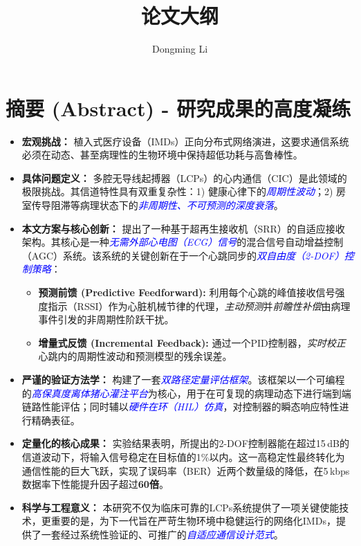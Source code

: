 \documentclass[UTF8,zihao=-4]{ctexart}
\title{\Huge\bfseries 论文大纲}
\author{Dongming Li}
\newcommand{\keyterm}[1]{\textit{\textcolor{blue}{#1}}}
\begin{document}
\maketitle
\thispagestyle{empty}
\newpage
\tableofcontents
\newpage

\section{摘要 (Abstract) - 研究成果的高度凝练}
\begin{itemize}
    \item \textbf{宏观挑战：} 植入式医疗设备（IMDs）正向分布式网络演进，这要求通信系统必须在动态、甚至病理性的生物环境中保持超低功耗与高鲁棒性。
    \item \textbf{具体问题定义：} 多腔无导线起搏器（LCPs）的心内通信（CIC）是此领域的极限挑战。其信道特性具有双重复杂性：1) 健康心律下的\keyterm{周期性波动}；2) 房室传导阻滞等病理状态下的\keyterm{非周期性、不可预测的深度衰落}。
    \item \textbf{本文方案与核心创新：} 提出了一种基于超再生接收机（SRR）的自适应接收架构。其核心是一种\keyterm{无需外部心电图（ECG）信号}的混合信号自动增益控制（AGC）系统。该系统的关键创新在于一个心跳同步的\keyterm{双自由度（2-DOF）控制策略}：
        \begin{itemize}
            \item \textbf{预测前馈 (Predictive Feedforward):} 利用每个心跳的峰值接收信号强度指示（RSSI）作为心脏机械节律的代理，\textit{主动预测}并\textit{前瞻性补偿}由病理事件引发的非周期性阶跃干扰。
            \item \textbf{增量式反馈 (Incremental Feedback):} 通过一个PID控制器，\textit{实时校正}心跳内的周期性波动和预测模型的残余误差。
        \end{itemize}
    \item \textbf{严谨的验证方法学：} 构建了一套\keyterm{双路径定量评估框架}。该框架以一个可编程的\keyterm{高保真度离体猪心灌注平台}为核心，用于在可复现的病理动态下进行端到端链路性能评估；同时辅以\keyterm{硬件在环（HIL）仿真}，对控制器的瞬态响应特性进行精确表征。
    \item \textbf{定量化的核心成果：} 实验结果表明，所提出的2-DOF控制器能在超过15\,dB的信道波动下，将输入信号稳定在目标值的1\%以内。这一高稳定性最终转化为通信性能的巨大飞跃，实现了误码率（BER）近两个数量级的降低，在5\,kbps数据率下性能提升因子超过\textbf{60倍}。
    \item \textbf{科学与工程意义：} 本研究不仅为临床可靠的LCPs系统提供了一项关键使能技术，更重要的是，为下一代旨在严苛生物环境中稳健运行的网络化IMDs，提供了一套经过系统性验证的、可推广的\keyterm{自适应通信设计范式}。
\end{itemize}
\end{document}
